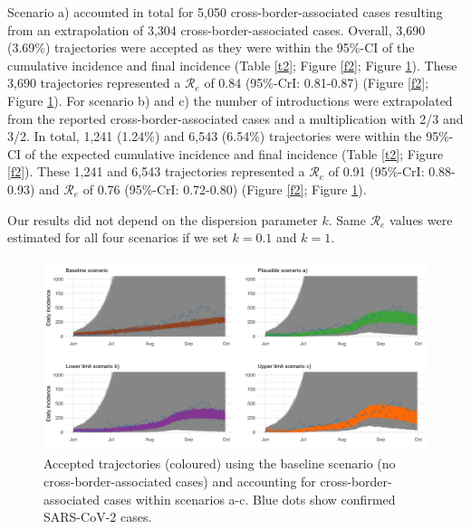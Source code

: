 \documentclass[10pt, a4paper, twoside]{article}
\begin{document}
\begin{multicols}{2}
Scenario a) accounted in total for 5,050 cross-border-associated cases resulting from an extrapolation of 3,304 cross-border-associated cases.
Overall, 3,690 (3.69\%) trajectories were accepted as they were within the 95\%-CI of the cumulative incidence and final incidence (Table \ref{t2}; Figure \ref{f2}; Figure \ref{f3}).
These 3,690 trajectories represented a $\mathcal{R}_e$ of 0.84 (95\%-CrI: 0.81-0.87) (Figure \ref{f2}; Figure \ref{f3}).
For scenario b) and c) the number of introductions were extrapolated from the reported cross-border-associated cases and a multiplication with 2/3 and 3/2.
In total, 1,241 (1.24\%) and 6,543 (6.54\%) trajectories were within the 95\%-CI of the expected cumulative incidence and final incidence (Table \ref{t2}; Figure \ref{f2}).
These 1,241 and 6,543 trajectories represented a $\mathcal{R}_e$ of 0.91 (95\%-CrI: 0.88-0.93) and $\mathcal{R}_e$ of 0.76 (95\%-CrI: 0.72-0.80) (Figure \ref{f2}; Figure \ref{f3}).

Our results did not depend on the dispersion parameter $k$.
Same $\mathcal{R}_e$ values were estimated for all four scenarios if we set $k = 0.1$ and $k = 1$.

\begin{figure}
\centering
\includegraphics[scale=0.15]{Figure3_2021-06-02.png}
\caption{Accepted trajectories (coloured) using the baseline scenario (no cross-border-associated cases) and accounting for cross-border-associated cases within scenarios a-c. Blue dots show confirmed SARS-CoV-2 cases.}
\label{f3}
\end{figure}


\end{multicols}
\end{document}

